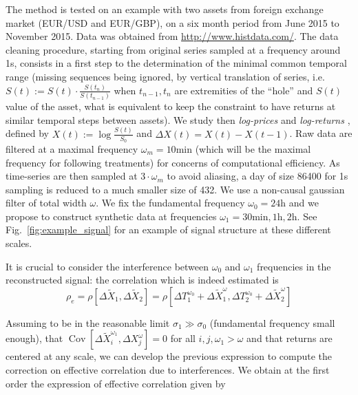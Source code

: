 \documentclass{article}
\DeclareMathOperator{\Cov}{Cov}
\newcommand{\Covb}[2]{\ensuremath{\Cov\!\left[#1,#2\right]}}
\begin{document}
The method is tested on an example with two assets from foreign exchange market (EUR/USD and EUR/GBP), on a six month period from June 2015 to November 2015. Data was obtained from \url{http://www.histdata.com/}. The data cleaning procedure, starting from original series sampled at a frequency around 1s, consists in a first step to the determination of the minimal common temporal range (missing sequences being ignored, by vertical translation of series, i.e. $S(t):=S(t)\cdot \frac{S(t_{n})}{S(t_{n-1})}$ when $t_{n-1},t_n$ are extremities of the ``hole'' and $S(t)$ value of the asset, what is equivalent to keep the constraint to have returns at similar temporal steps between assets). We study then \emph{log-prices} and \emph{log-returns} \cite{mantegna1999introduction}, defined by $X(t):=\log{\frac{S(t)}{S_0}}$ and $\Delta X (t) = X(t) - X(t-1)$. Raw data are filtered at a maximal frequency $\omega_m = 10\textrm{min}$ (which will be the maximal frequency for following treatments) for concerns of computational efficiency. As time-series are then sampled at $3\cdot\omega_m$ to avoid aliasing, a day of size 86400 for 1s sampling is reduced to a much smaller size of 432. We use a non-causal gaussian filter of total width $\omega$. We fix the fundamental frequency $\omega_0=24\textrm{h}$ and we propose to construct synthetic data at frequencies $\omega_1 = 30\textrm{min},1\textrm{h},2\textrm{h}$. See Fig.~\ref{fig:example_signal} for an example of signal structure at these different scales.





It is crucial to consider the interference between $\omega_0$ and $\omega_1$ frequencies in the reconstructed signal: the correlation which is indeed estimated is 
\[
\rho_{e} = \rho \left[ \Delta \tilde{X}_1 , \Delta \tilde{X}_2 \right] = \rho \left[ \Delta T_1^{\omega_0} + \Delta \tilde{X}_1^{\omega} , \Delta T_2^{\omega_0} + \Delta \tilde{X}_2^{\omega}\right]
\]


Assuming to be in the reasonable limit $\sigma_1 \gg \sigma_0$ (fundamental frequency small enough), that $\Covb{\Delta \tilde{X}_i^{\omega_1}}{\Delta X_j^{\omega}}=0$ for all $i,j,\omega_1 > \omega$ and that returns are centered at any scale, we can develop the previous expression to compute the correction on effective correlation due to interferences. We obtain at the first order the expression of effective correlation given by
\end{document}
